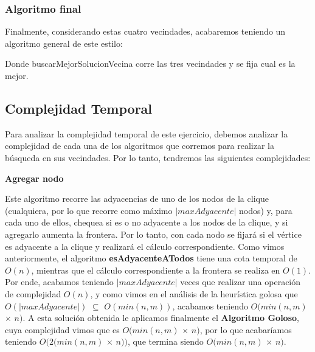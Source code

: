 \subsubsection{Algoritmo final}
Finalmente, considerando estas cuatro vecindades, acabaremos teniendo un algoritmo general de este estilo:

\begin{algorithm}[H]
 \NoCaptionOfAlgo
 \caption{}


\end{algorithm}

Donde buscarMejorSolucionVecina corre las tres vecindades y se fija cual es la mejor.

\subsection{Complejidad Temporal}
Para analizar la complejidad temporal de este ejercicio, debemos analizar la complejidad de cada una de los algoritmos que corremos para realizar la búsqueda en sus vecindades. Por lo tanto, tendremos las siguientes complejidades:

\begin{center}
	\textbf{Agregar nodo}
\end{center}
Este algoritmo recorre las adyacencias de uno de los nodos de la clique (cualquiera, por lo que recorre como máximo $|maxAdyacente|$ nodos) y, para cada uno de ellos, chequea si es o no adyacente a los nodos de la clique, y si agregarlo aumenta la frontera. Por lo tanto, con cada nodo se fijará si el vértice es adyacente a la clique y realizará el cálculo correspondiente. Como vimos anteriormente, el algoritmo \textbf{esAdyacenteATodos} tiene una cota temporal de $O(n)$, mientras que el cálculo correspondiente a la frontera se realiza en $O(1)$. Por ende, acabamos teniendo $|maxAdyacente|$ veces que realizar una operación de complejidad $O(n)$, y como vimos en el análisis de la heurística golosa que $O(|maxAdyacente|)$ $\subseteq$ $O(min(n,m))$, acabamos teniendo $O(min(n,m)$ $\times$ $n)$. A esta solución obtenida le aplicamos finalmente el \textbf{Algoritmo Goloso}, cuya complejidad vimos que es $O(min(n,m)$ $\times$ $n)$, por lo que acabaríamos teniendo $O(2 (min(n,m)$ $\times$ $n))$, que termina siendo $O(min(n,m)$ $\times$ $n)$.

